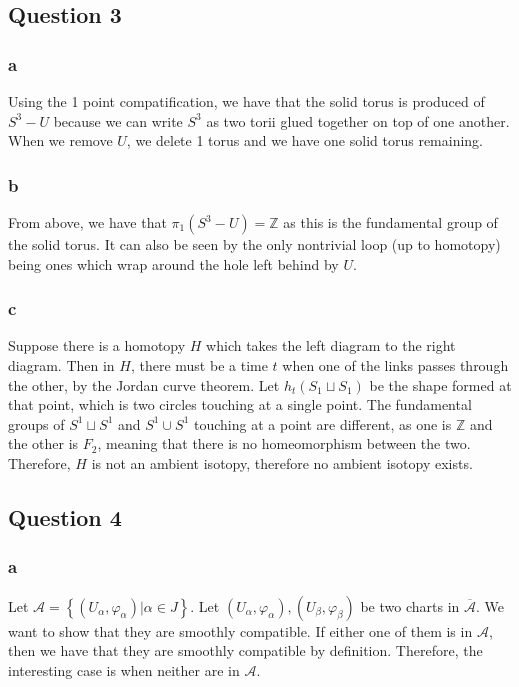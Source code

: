 \documentclass{article}
\theoremstyle{definition}
\numberwithin{theorem}{section}
\numberwithin{equation}{section}
\newcommand{\atlas}{\mathcal{A}}
\begin{document}
\subsection{Question 3}

\subsubsection{a}
Using the 1 point compatification, we have that the solid torus is produced of $S^3 - U$ because we can write $S^3$ as two torii glued together on top of one another. When we remove $U$, we delete 1 torus and we have one solid torus remaining. 
\subsubsection{b}
From above, we have that $\pi_1(S^3 - U) = \mathbb{Z}$ as this is the fundamental group of the solid torus. It can also be seen by the only nontrivial loop (up to homotopy) being ones which wrap around the hole left behind by $U$. 
\subsubsection{c}
Suppose there is a homotopy $H$ which takes the left diagram to the right diagram. Then in $H$, there must be a time $t$ when one of the links passes through the other, by the Jordan curve theorem. Let $h_t(S_1 \sqcup S_1)$ be the shape formed at that point, which is two circles touching at a single point. The fundamental groups of $S^1 \sqcup S^1$ and $S^1 \cup S^1$ touching at a point are different, as one is $\mathbb{Z}$ and the other is $F_2$, meaning that there is no homeomorphism between the two. Therefore, $H$ is not an ambient isotopy, therefore no ambient isotopy exists. 

\subsection{Question 4}
\subsubsection{a}
Let $\atlas = \left\{(U_\alpha, \varphi_\alpha) | \alpha \in J\right\}$. Let $(U_\alpha, \varphi_\alpha), (U_\beta, \varphi_\beta)$ be two charts in $\overline{\atlas}$. We want to show that they are smoothly compatible. If either one of them is in $\atlas$, then we have that they are smoothly compatible by definition. Therefore, the interesting case is when neither are in $\atlas$. 
\end{document}
